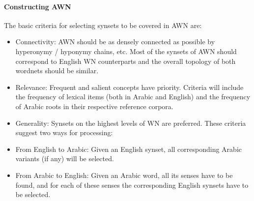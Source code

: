 \paragraph{Constructing AWN}
The basic criteria for selecting synsets to be covered in AWN are\citep{awn_2}: 
\begin{itemize}
\item Connectivity: AWN should be as densely connected as possible by hyperonymy / hyponymy chains, etc. Most of the synsets of AWN should correspond to English WN counterparts and the overall topology of both wordnets should be similar.
\item Relevance: Frequent and salient concepts have priority. Criteria will include the frequency of lexical items (both in Arabic and English) and the frequency of Arabic roots in their respective reference corpora.
\item Generality: Synsets on the highest levels of WN are preferred. These criteria suggest two ways for processing:
\item From English to Arabic: Given an English synset, all corresponding Arabic variants (if any) will be selected.
\item From Arabic to English: Given an Arabic word, all its senses have to be found, and for each of these senses the corresponding English synsets have to be selected.
\end{itemize}

